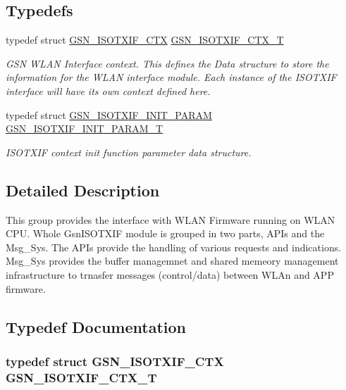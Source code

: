 \subsection*{Typedefs}
\begin{DoxyCompactItemize}
\item 
typedef struct \hyperlink{a00105}{GSN\_\-ISOTXIF\_\-CTX} \hyperlink{a00625_ga35f27a7ee5e85ca8decc1f1636e8ca08}{GSN\_\-ISOTXIF\_\-CTX\_\-T}
\begin{DoxyCompactList}\small\item\em GSN WLAN Interface context. This defines the Data structure to store the information for the WLAN interface module. Each instance of the ISOTXIF interface will have its own context defined here. \end{DoxyCompactList}\item 
typedef struct \hyperlink{a00106}{GSN\_\-ISOTXIF\_\-INIT\_\-PARAM} \hyperlink{a00625_ga86fe1e652bfee5af4919a3021fa448fc}{GSN\_\-ISOTXIF\_\-INIT\_\-PARAM\_\-T}
\begin{DoxyCompactList}\small\item\em ISOTXIF context init function parameter data structure. \end{DoxyCompactList}\end{DoxyCompactItemize}


\subsection{Detailed Description}
This group provides the interface with WLAN Firmware running on WLAN CPU. Whole GsnISOTXIF module is grouped in two parts, APIs and the Msg\_\-Sys. The APIs provide the handling of various requests and indications. Msg\_\-Sys provides the buffer managemnet and shared memeory management infrastructure to trnasfer messages (control/data) between WLAn and APP firmware. 

\subsection{Typedef Documentation}
\hypertarget{a00625_ga35f27a7ee5e85ca8decc1f1636e8ca08}{
\subsubsection[{GSN\_\-ISOTXIF\_\-CTX\_\-T}]{\setlength{\rightskip}{0pt plus 5cm}typedef struct {\bf GSN\_\-ISOTXIF\_\-CTX} {\bf GSN\_\-ISOTXIF\_\-CTX\_\-T}}}
\label{a00625_ga35f27a7ee5e85ca8decc1f1636e8ca08}


